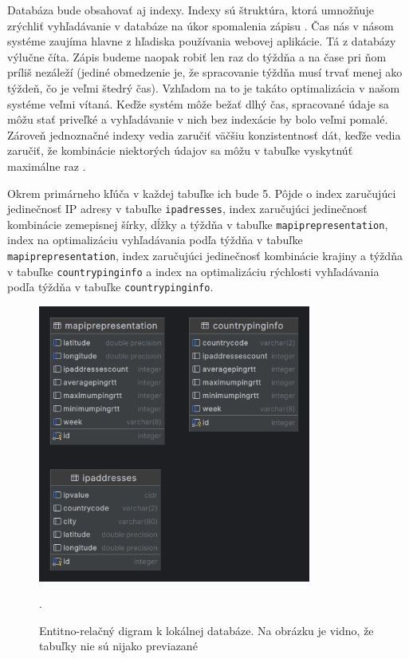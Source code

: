 Databáza bude obsahovať aj indexy. Indexy sú štruktúra, ktorá umnožňuje zrýchliť vyhľadávanie v databáze na úkor spomalenia zápisu \cite{db_index}. 
Čas nás v násom systéme zaujíma hlavne z hľadiska používania webovej aplikácie. Tá z databázy výlučne číta. Zápis budeme naopak robiť len raz do týždňa 
a na čase pri ňom príliš nezáleží (jediné obmedzenie je, že spracovanie týždňa musí trvať menej ako týždeň, čo je veľmi štedrý čas). Vzhľadom na to je 
takáto optimalizácia v našom systéme veľmi vítaná. Keďže systém môže bežať dlhý čas, spracované údaje sa môžu stať priveľké a vyhľadávanie v nich bez 
indexácie by bolo veľmi pomalé. Zároveň jednoznačné indexy vedia zaručiť väčšiu konzistentnosť dát, keďže vedia zaručiť, že kombinácie niektorých údajov 
sa môžu v tabuľke vyskytnúť maximálne raz \cite{index_strategy}.

Okrem primárneho kľúča v každej tabuľke ich bude 5. Pôjde o index zaručujúci jedinečnosť IP adresy v tabuľke 
\lstinline{ipadresses}, index zaručujúci jedinečnosť kombinácie zemepisnej šírky, dĺžky a týždňa v tabuľke \lstinline{mapiprepresentation}, index na 
optimalizáciu vyhľadávania podľa týždňa v tabuľke \lstinline{mapiprepresentation}, index zaručujúci jedinečnosť kombinácie krajiny a týždňa v tabuľke 
\lstinline{countrypinginfo} a index na optimalizáciu rýchlosti vyhľadávania podľa týždňa v tabuľke \lstinline{countrypinginfo}.

\begin{figure}
    \centerline{\includegraphics[width=0.8\textwidth]{images/ipinfoviewerprocesseddb}}
    \caption[Entitno-relačný digram k lokálnej databáze]{Entitno-relačný digram k lokálnej databáze. 
    Na obrázku je vidno, že tabuľky nie sú nijako previazané}.
    \label{obr:entitn_diagram}
\end{figure}